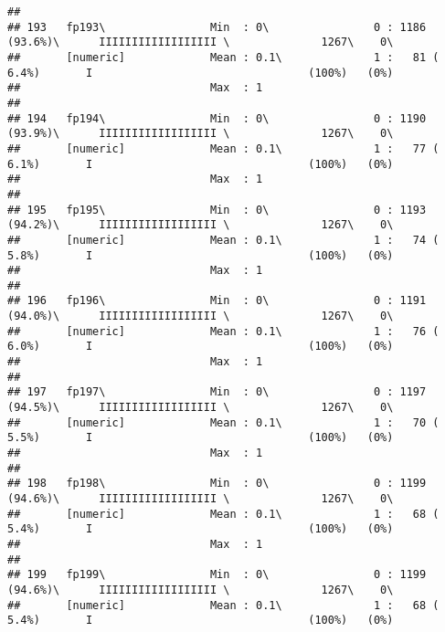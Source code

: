 \documentclass[]{article}
\begin{document}
\begin{verbatim}
## 
## 193   fp193\                Min  : 0\                0 : 1186 (93.6%)\      IIIIIIIIIIIIIIIIII \              1267\    0\       
##       [numeric]             Mean : 0.1\              1 :   81 ( 6.4%)       I                                 (100%)   (0%)     
##                             Max  : 1                                                                                            
## 
## 194   fp194\                Min  : 0\                0 : 1190 (93.9%)\      IIIIIIIIIIIIIIIIII \              1267\    0\       
##       [numeric]             Mean : 0.1\              1 :   77 ( 6.1%)       I                                 (100%)   (0%)     
##                             Max  : 1                                                                                            
## 
## 195   fp195\                Min  : 0\                0 : 1193 (94.2%)\      IIIIIIIIIIIIIIIIII \              1267\    0\       
##       [numeric]             Mean : 0.1\              1 :   74 ( 5.8%)       I                                 (100%)   (0%)     
##                             Max  : 1                                                                                            
## 
## 196   fp196\                Min  : 0\                0 : 1191 (94.0%)\      IIIIIIIIIIIIIIIIII \              1267\    0\       
##       [numeric]             Mean : 0.1\              1 :   76 ( 6.0%)       I                                 (100%)   (0%)     
##                             Max  : 1                                                                                            
## 
## 197   fp197\                Min  : 0\                0 : 1197 (94.5%)\      IIIIIIIIIIIIIIIIII \              1267\    0\       
##       [numeric]             Mean : 0.1\              1 :   70 ( 5.5%)       I                                 (100%)   (0%)     
##                             Max  : 1                                                                                            
## 
## 198   fp198\                Min  : 0\                0 : 1199 (94.6%)\      IIIIIIIIIIIIIIIIII \              1267\    0\       
##       [numeric]             Mean : 0.1\              1 :   68 ( 5.4%)       I                                 (100%)   (0%)     
##                             Max  : 1                                                                                            
## 
## 199   fp199\                Min  : 0\                0 : 1199 (94.6%)\      IIIIIIIIIIIIIIIIII \              1267\    0\       
##       [numeric]             Mean : 0.1\              1 :   68 ( 5.4%)       I                                 (100%)   (0%)     

\end{verbatim}
\end{document}

